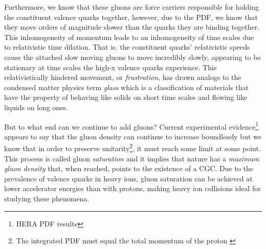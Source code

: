 Furthermore, we know that these gluons are force carriers responsible for holding the constituent valence quarks together, however, due to the PDF, we know that they move orders of magnitude slower than the quarks they are binding together. This inhomogeneity of momentum leads to an inhomogeneity of time scales due to relativistic time dilation. That is, the constituent quarks' relativistic speeds cause the attached slow moving gluons to move incredibly slowly, appearing to be stationary at time scales the high-x valence quarks experience. This relativistically hindered movement, or \textit{frustration}, has drawn analogs to the condensed matter physics term \textit{glass} which is a classification of materials that have the property of behaving like solids on short time scales and flowing like liquids on long ones. 

But to what end can we continue to add gluons? Current experimental evidence\footnote{HERA PDF results} appears to say that the gluon density can continue to increase boundlessly but we know that in order to preserve unitarity\footnote{The integrated PDF must equal the total momentum of the proton \citep{HemmickRHIClecture}}, it must reach some limit at some point. This process is called gluon \textit{saturation} and it implies that nature has a \textit{maximum gluon density} that, when reached, points to the existence of a CGC\citep{HemmickRHIClecture}. Due to the prevalence of valence quarks in heavy ions, gluon saturation can be achieved at lower accelerator energies than with protons, making heavy ion collisions ideal for studying these phenomena.

